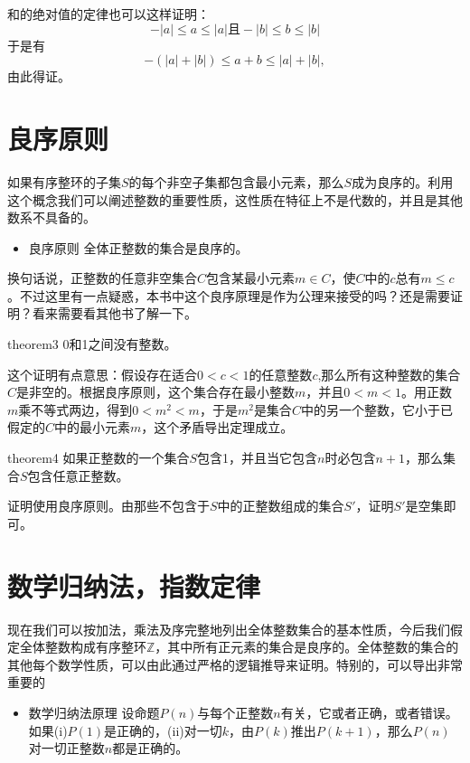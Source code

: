 和的绝对值的定律也可以这样证明：
\[
-|a| \le a \le |a| \text{且} -|b| \le b \le |b|
\]
于是有
\[
-(|a|+|b|) \le  a + b \le |a|+|b|,
\]
由此得证。


\section{良序原则}
如果有序整环的子集$S$的每个非空子集都包含最小元素，那么$S$成为良序的。利用这个概念我们可以阐述整数的重要性质，这性质在特征上不是代数的，并且是其他数系不具备的。
\begin{itemize}
\item 良序原则 全体正整数的集合是良序的。
\end{itemize}

换句话说，正整数的任意非空集合$C$包含某最小元素$m \in C$，使$C$中的$c$总有$m \le c$。不过这里有一点疑惑，本书中这个良序原理是作为公理来接受的吗？还是需要证明？看来需要看其他书了解一下。

\begin{theorem}{}{theorem3}
0和1之间没有整数。
\end{theorem}

这个证明有点意思：假设存在适合$0<c<1$的任意整数$c$,那么所有这种整数的集合$C$是非空的。根据良序原则，这个集合存在最小整数$m$，并且$0 < m < 1$。用正数$m$乘不等式两边，得到$0 < m^2 < m$，于是$m^2$是集合$C$中的另一个整数，它小于已假定的$C$中的最小元素$m$，这个矛盾导出定理成立。

\begin{theorem}{}{theorem4}
如果正整数的一个集合$S$包含1，并且当它包含$n$时必包含$n+1$，那么集合$S$包含任意正整数。
\end{theorem}

证明使用良序原则。由那些不包含于$S$中的正整数组成的集合$S'$，证明$S'$是空集即可。

\section{数学归纳法，指数定律}
现在我们可以按加法，乘法及序完整地列出全体整数集合的基本性质，今后我们假定全体整数构成有序整环$\mathbb{Z}$，其中所有正元素的集合是良序的。全体整数的集合的其他每个数学性质，可以由此通过严格的逻辑推导来证明。特别的，可以导出非常重要的
\begin{itemize}
\item \textcolor{main}{数学归纳法原理} 设命题$P(n)$与每个正整数$n$有关，它或者正确，或者错误。如果(i)$P(1)$是正确的，(ii)对一切$k$，由$P(k)$推出$P(k+1)$，那么$P(n)$对一切正整数$n$都是正确的。
\end{itemize}

